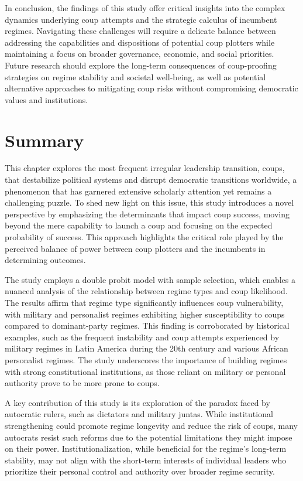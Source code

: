 \documentclass[
  12pt,
]{report}
\begin{document}
In conclusion, the findings of this study offer critical insights into
the complex dynamics underlying coup attempts and the strategic calculus
of incumbent regimes. Navigating these challenges will require a
delicate balance between addressing the capabilities and dispositions of
potential coup plotters while maintaining a focus on broader governance,
economic, and social priorities. Future research should explore the
long-term consequences of coup-proofing strategies on regime stability
and societal well-being, as well as potential alternative approaches to
mitigating coup risks without compromising democratic values and
institutions.

\section{Summary}\label{summary}

This chapter explores the most frequent irregular leadership transition,
coups, that destabilize political systems and disrupt democratic
transitions worldwide, a phenomenon that has garnered extensive
scholarly attention yet remains a challenging puzzle. To shed new light
on this issue, this study introduces a novel perspective by emphasizing
the determinants that impact coup success, moving beyond the mere
capability to launch a coup and focusing on the expected probability of
success. This approach highlights the critical role played by the
perceived balance of power between coup plotters and the incumbents in
determining outcomes.

The study employs a double probit model with sample selection, which
enables a nuanced analysis of the relationship between regime types and
coup likelihood. The results affirm that regime type significantly
influences coup vulnerability, with military and personalist regimes
exhibiting higher susceptibility to coups compared to dominant-party
regimes. This finding is corroborated by historical examples, such as
the frequent instability and coup attempts experienced by military
regimes in Latin America during the 20th century and various African
personalist regimes. The study underscores the importance of building
regimes with strong constitutional institutions, as those reliant on
military or personal authority prove to be more prone to coups.

A key contribution of this study is its exploration of the paradox faced
by autocratic rulers, such as dictators and military juntas. While
institutional strengthening could promote regime longevity and reduce
the risk of coups, many autocrats resist such reforms due to the
potential limitations they might impose on their power.
Institutionalization, while beneficial for the regime's long-term
stability, may not align with the short-term interests of individual
leaders who prioritize their personal control and authority over broader
regime security.
\end{document}
